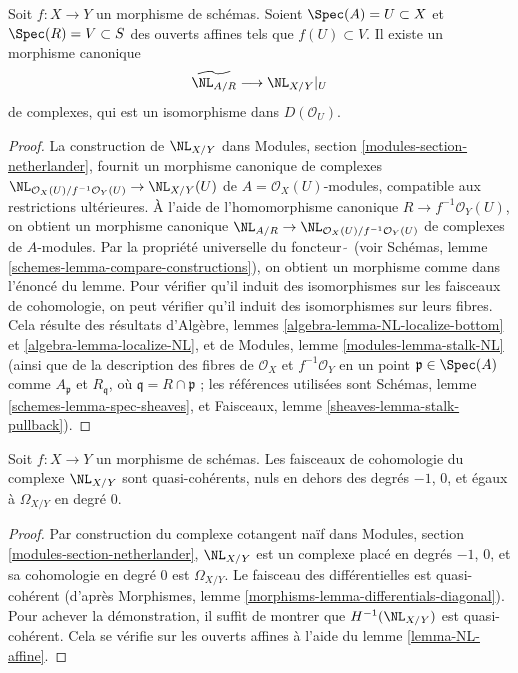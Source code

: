 \begin{lemma}
\label{lemma-NL-affine}
Soit $f : X \to Y$ un morphisme de schémas. Soient
$\Spec(A) = U \subset X$ et $\Spec(R) = V \subset S$
des ouverts affines tels que $f(U) \subset V$.
Il existe un morphisme canonique
$$
\widetilde{\NL_{A/R}} \longrightarrow \NL_{X/Y}|_U
$$
de complexes, qui est un isomorphisme dans $D(\mathcal{O}_U)$.
\end{lemma}

\begin{proof}
La construction de $\NL_{X/Y}$ dans
Modules, section \ref{modules-section-netherlander},
fournit un morphisme canonique de complexes
$\NL_{\mathcal{O}_X(U)/f^{-1}\mathcal{O}_Y(U)} \to \NL_{X/Y}(U)$
de $A = \mathcal{O}_X(U)$-modules, compatible
aux restrictions ultérieures. À l'aide de l'homomorphisme canonique
$R \to f^{-1}\mathcal{O}_Y(U)$, on obtient un morphisme canonique
$\NL_{A/R} \to \NL_{\mathcal{O}_X(U)/f^{-1}\mathcal{O}_Y(U)}$
de complexes de $A$-modules.
Par la propriété universelle du foncteur $\widetilde{\ }$
(voir Schémas, lemme \ref{schemes-lemma-compare-constructions}),
on obtient un morphisme comme dans l'énoncé du lemme.
Pour vérifier qu'il induit des isomorphismes sur les faisceaux de cohomologie,
on peut vérifier qu'il induit des isomorphismes sur leurs fibres.
Cela résulte des résultats d'Algèbre,
lemmes \ref{algebra-lemma-NL-localize-bottom} et
\ref{algebra-lemma-localize-NL},
et de
Modules, lemme \ref{modules-lemma-stalk-NL}
(ainsi que de la description des fibres de
$\mathcal{O}_X$ et $f^{-1}\mathcal{O}_Y$
en un point $\mathfrak p \in \Spec(A)$ comme $A_\mathfrak p$ et
$R_\mathfrak q$, où $\mathfrak q = R \cap \mathfrak p$ ; les références
utilisées sont Schémas, lemme \ref{schemes-lemma-spec-sheaves},
et
Faisceaux, lemme \ref{sheaves-lemma-stalk-pullback}).
\end{proof}

\begin{lemma}
\label{lemma-netherlander-quasi-coherent}
Soit $f : X \to Y$ un morphisme de schémas. Les faisceaux de cohomologie
du complexe $\NL_{X/Y}$ sont quasi-cohérents, nuls en dehors des
degrés $-1$, $0$, et égaux à $\Omega_{X/Y}$ en degré $0$.
\end{lemma}

\begin{proof}
Par construction du complexe cotangent naïf dans
Modules, section \ref{modules-section-netherlander},
$\NL_{X/Y}$ est un complexe placé en degrés $-1$, $0$,
et sa cohomologie en degré $0$ est $\Omega_{X/Y}$.
Le faisceau des différentielles est quasi-cohérent (d'après
Morphismes, lemme \ref{morphisms-lemma-differentials-diagonal}).
Pour achever la démonstration, il suffit de montrer que $H^{-1}(\NL_{X/Y})$
est quasi-cohérent. Cela se vérifie sur les ouverts affines
à l'aide du lemme \ref{lemma-NL-affine}.
\end{proof}

